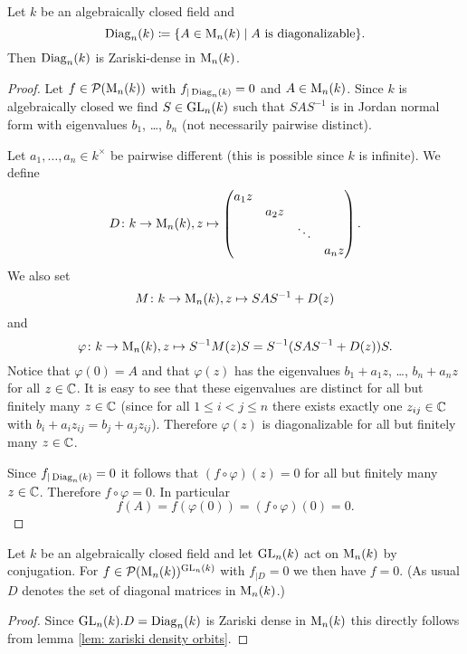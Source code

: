\begin{prop}
 Let $k$ be an algebraically closed field and
 \[
  \operatorname{Diag}_n(k) \coloneqq \{A \in \operatorname{M}_n(k) \mid \text{$A$ is diagonalizable}\}.
 \]
 Then $\operatorname{Diag}_n(k)$ is Zariski-dense in $\operatorname{M}_n(k)$.
\end{prop}
\begin{proof}
 Let $f \in \mathcal{P}(\operatorname{M}_n(k))$ with $f_{|\operatorname{Diag}_n(k)} = 0$ and $A \in \operatorname{M}_n(k)$. Since $k$ is algebraically closed we find $S \in \operatorname{GL}_n(k)$ such that $SAS^{-1}$ is in Jordan normal form with eigenvalues $b_1$, \dots, $b_n$ (not necessarily pairwise distinct).
 
 Let $a_1, \dotsc, a_n \in k^\times$ be pairwise different (this is possible since $k$ is infinite). We define
 \[
  D \colon k \to \operatorname{M}_n(k), z \mapsto
  \begin{pmatrix}
   a_1 z &       &        &       \\
         & a_2 z &        &       \\
         &       & \ddots &       \\
         &       &        & a_n z
  \end{pmatrix}.
 \]
 We also set
 \[
  M \colon k \to \operatorname{M}_n(k), z \mapsto SAS^{-1} + D(z)
 \]
 and
 \[
  \varphi \colon k \to \operatorname{M}_n(k), z \mapsto S^{-1} M(z) S = S^{-1}(SAS^{-1}+D(z))S.
 \]
 Notice that $\varphi(0) = A$ and that $\varphi(z)$ has the eigenvalues $b_1 + a_1 z$, \dots, $b_n + a_n z$ for all $z \in \mathbb{C}$. It is easy to see that these eigenvalues are distinct for all but finitely many $z \in \mathbb{C}$ (since for all $1 \leq i < j \leq n$ there exists exactly one $z_{ij} \in \mathbb{C}$ with $b_i + a_i z_{ij} = b_j + a_j z_{ij}$). Therefore $\varphi(z)$ is diagonalizable for all but finitely many $z \in \mathbb{C}$.
 
 Since $f_{|\operatorname{Diag}_n(k)} = 0$ it follows that $(f \circ \varphi)(z) = 0$ for all but finitely many $z \in \mathbb{C}$. Therefore $f \circ \varphi = 0$. In particular
 \[
  f(A) = f(\varphi(0)) = (f \circ \varphi)(0) = 0.
 \]
\end{proof}


\begin{cor}
 Let $k$ be an algebraically closed field and let $\operatorname{GL}_n(k)$ act on $\operatorname{M}_n(k)$ by conjugation. For $f \in \mathcal{P}(\operatorname{M}_n(k))^{\operatorname{GL}_n(k)}$ with $f_{|D} = 0$ we then have $f = 0$. (As usual $D$ denotes the set of diagonal matrices in $\operatorname{M}_n(k)$.)
\end{cor}
\begin{proof}
 Since $\operatorname{GL}_n(k).D = \operatorname{Diag}_n(k)$ is Zariski dense in $\operatorname{M}_n(k)$ this directly follows from lemma \ref{lem: zariski density orbits}.
\end{proof}


